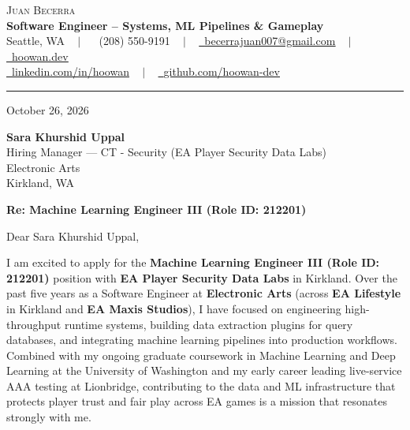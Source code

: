 \documentclass[letterpaper,11pt]{article}
\begin{document}
\begin{center}
    {\Huge \scshape Juan Becerra} \\ \vspace{4pt}
    \textbf{\large Software Engineer -- Systems, ML Pipelines \& Gameplay} \\ \vspace{4pt}
    \small Seattle, WA ~ $|$ ~
    \raisebox{-0.1\height}\faPhone\ (208) 550-9191 ~ $|$ ~
    \href{mailto:becerrajuan007@gmail.com}{\raisebox{-0.2\height}\faEnvelope\ \underline{becerrajuan007@gmail.com}} ~ $|$ ~
    \href{https://hoowan.dev}{\raisebox{-0.2\height}\faGlobe\ \underline{hoowan.dev}} \\ \vspace{2pt}
    \href{https://linkedin.com/in/hoowan/}{\raisebox{-0.2\height}\faLinkedin\ \underline{linkedin.com/in/hoowan}} ~ $|$ ~
    \href{https://github.com/hoowan-dev}{\raisebox{-0.2\height}\faGithub\ \underline{github.com/hoowan-dev}}
\end{center}

\vspace{4pt}
\hrule
\vspace{14pt}

\noindent October 26, 2026

\vspace{8pt}
\noindent \textbf{Sara Khurshid Uppal} \\
Hiring Manager --- CT - Security (EA Player Security Data Labs) \\
Electronic Arts \\
Kirkland, WA

\vspace{8pt}
\noindent \textbf{Re: Machine Learning Engineer III (Role ID: 212201)}

\vspace{8pt}
\noindent Dear Sara Khurshid Uppal,

I am excited to apply for the \textbf{Machine Learning Engineer III (Role ID: 212201)} position with \textbf{EA Player Security Data Labs} in Kirkland. Over the past five years as a Software Engineer at \textbf{Electronic Arts} (across \textbf{EA Lifestyle} in Kirkland and \textbf{EA Maxis Studios}), I have focused on engineering high-throughput runtime systems, building data extraction plugins for query databases, and integrating machine learning pipelines into production workflows. Combined with my ongoing graduate coursework in Machine Learning and Deep Learning at the University of Washington and my early career leading live-service AAA testing at Lionbridge, contributing to the data and ML infrastructure that protects player trust and fair play across EA games is a mission that resonates strongly with me.
\end{document}
